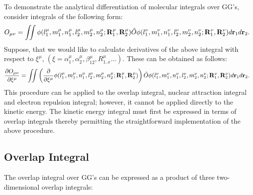 To demonstrate the analytical differentiation of molecular integrals over
GG's, consider integrals of the following form: 
\begin{equation}
O_{\mu \nu }=\int \!\!\!\int \phi (l_1^\mu ,m_1^\mu ,n_1^\mu ,l_2^\mu
,m_2^\mu ,n_2^\mu ;{\bf R}_1^\mu ,{\bf R}_2^\mu ){\hat{O}}\phi (l_1^\nu
,m_1^\nu ,n_1^\nu ,l_2^\nu ,m_2^\nu ,n_2^\nu ;{\bf R}_1^\nu ,{\bf R}_2^\nu )d%
{\bf r}_1d{\bf r}_2.
\end{equation}
Suppose, that we would like to calculate derivatives of the above integral
with respect to $\xi ^\mu $, $(\xi =\alpha _1^\mu ,\alpha _2^\mu ,\beta
_{12}^\mu ,R_{1,x}^\mu \ldots )$. These can be obtained as follows: 
\begin{equation}
{\frac{\partial O_{\mu \nu }}{\partial \xi ^\mu }}=\int \!\!\!\int \left( {%
\frac \partial {\partial \xi ^\mu }}\phi (l_1^\mu ,m_1^\mu ,n_1^\mu ,l_2^\mu
,m_2^\mu ,n_2^\mu ;{\bf R}_1^\mu ,{\bf R}_2^\mu )\right) {\hat{O}}\phi
(l_1^\nu ,m_1^\nu ,n_1^\nu ,l_2^\nu ,m_2^\nu ,n_2^\nu ;{\bf R}_1^\nu ,{\bf R}%
_2^\nu )d{\bf r}_1d{\bf r}_2.
\end{equation}
This procedure can be applied to the overlap integral, nuclear attraction
integral and electron repulsion integral; however, it cannot be applied
directly to the kinetic energy. The kinetic energy integral must first be
expressed in terms of overlap integrals thereby permitting the
straightforward implementation of the above procedure.

\subsection{Overlap Integral}

The overlap integral over GG's can be expressed as a product of three
two-dimensional overlap integrals:

